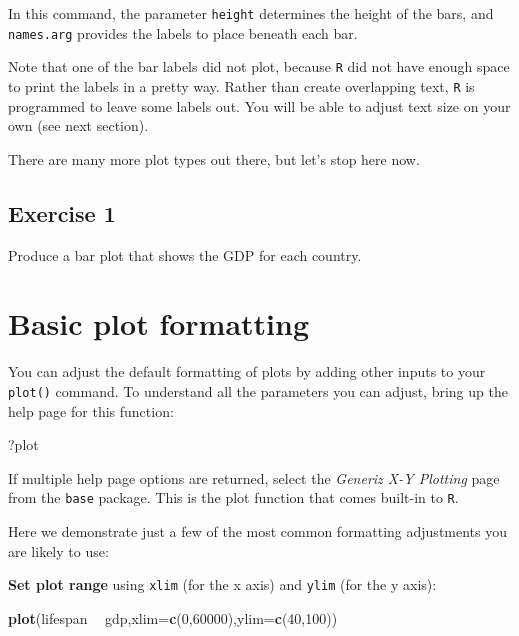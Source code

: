 \documentclass[
]{book}
\newenvironment{Shaded}{\begin{snugshade}}{\end{snugshade}}
\newcommand{\DataTypeTok}[1]{\textcolor[rgb]{0.13,0.29,0.53}{#1}}
\newcommand{\DecValTok}[1]{\textcolor[rgb]{0.00,0.00,0.81}{#1}}
\newcommand{\KeywordTok}[1]{\textcolor[rgb]{0.13,0.29,0.53}{\textbf{#1}}}
\newcommand{\NormalTok}[1]{#1}
\newcommand{\OperatorTok}[1]{\textcolor[rgb]{0.81,0.36,0.00}{\textbf{#1}}}
\newcommand{\StringTok}[1]{\textcolor[rgb]{0.31,0.60,0.02}{#1}}
\begin{document}
In this command, the parameter \texttt{height} determines the height of the bars, and \texttt{names.arg} provides the labels to place beneath each bar.

Note that one of the bar labels did not plot, because \texttt{R} did not have enough space to print the labels in a pretty way. Rather than create overlapping text, \texttt{R} is programmed to leave some labels out. You will be able to adjust text size on your own (see next section).

There are many more plot types out there, but let's stop here now.

\hypertarget{exercise-1-3}{%
\subsection*{Exercise 1}\label{exercise-1-3}}

Produce a bar plot that shows the GDP for each country.

\hypertarget{basic-plot-formatting}{%
\section*{Basic plot formatting}\label{basic-plot-formatting}}

You can adjust the default formatting of plots by adding other inputs to your \texttt{plot()} command. To understand all the parameters you can adjust, bring up the help page for this function:

\begin{Shaded}
\begin{Highlighting}[]
\NormalTok{?plot}
\end{Highlighting}
\end{Shaded}

If multiple help page options are returned, select the \emph{Generiz X-Y Plotting} page from the \texttt{base} package. This is the plot function that comes built-in to \texttt{R}.

Here we demonstrate just a few of the most common formatting adjustments you are likely to use:

\textbf{Set plot range} using \texttt{xlim} (for the x axis) and \texttt{ylim} (for the y axis):

\begin{Shaded}
\begin{Highlighting}[]
\KeywordTok{plot}\NormalTok{(lifespan }\OperatorTok{~}\StringTok{ }\NormalTok{gdp,}\DataTypeTok{xlim=}\KeywordTok{c}\NormalTok{(}\DecValTok{0}\NormalTok{,}\DecValTok{60000}\NormalTok{),}\DataTypeTok{ylim=}\KeywordTok{c}\NormalTok{(}\DecValTok{40}\NormalTok{,}\DecValTok{100}\NormalTok{))}
\end{Highlighting}
\end{Shaded}
\end{document}
